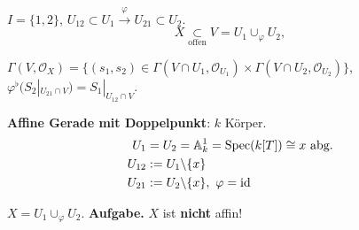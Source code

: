 \begin{example}[11]
  $I=\{1,2\}$, $U_{12}\subset U_{1}\xrightarrow{\varphi}U_{21}\subset U_{2}$.
  \[
    X\underset{\text{offen}}{\subset}V=U_{1}\cup_{\varphi}U_{2},
  \]

  $\Gamma(V,\mathcal{O}_{X})=\{(s_{1},s_{2})\in\Gamma(V\cap U_{1},\mathcal{O}_{U_{1}})\times\Gamma(V\cap U_{2},\mathcal{O}_{U_{2}})\}$,
  $\varphi^{\flat}(S_{2}|_{U_{21}\cap V})=S_{1}|_{U_{12}\cap V}$.
\end{example}

\textbf{Affine Gerade mit Doppelpunkt}: $k$ Körper.
\begin{align*}
  U_{1} & =U_{2}=\mathbb{A}_{k}^{1}=\operatorname{Spec}(k[T])\cong x\text{ abg.}\\
  U_{12} & :=U_{1}\backslash\{x\}\\
  U_{21} & :=U_{2}\backslash\{x\},\ \varphi=\operatorname{\mathrm{id}}
\end{align*}

$X=U_{1}\cup_{\varphi}U_{2}$.  
\textbf{Aufgabe.} $X$ ist \textbf{nicht} affin!
